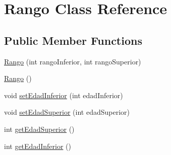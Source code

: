 \hypertarget{class_rango}{\section{Rango Class Reference}
\label{class_rango}
}
\subsection*{Public Member Functions}
\begin{DoxyCompactItemize}
\item 
\hyperlink{class_rango_aad365c7223fed54170da3b100af6fd81}{Rango} (int rango\+Inferior, int rango\+Superior)
\item 
\hyperlink{class_rango_ada7b488c2b1f8a362737f2795e5aedce}{Rango} ()
\item 
void \hyperlink{class_rango_afdf3104f892c99b1a963c5ba873be9c8}{set\+Edad\+Inferior} (int edad\+Inferior)
\item 
void \hyperlink{class_rango_ad6b19365f579231fc03541b62418de52}{set\+Edad\+Superior} (int edad\+Superior)
\item 
int \hyperlink{class_rango_af330df842f81084176cbaf5a15c947b9}{get\+Edad\+Superior} ()
\item 
int \hyperlink{class_rango_abcf7621bea5a9494eb4612b9fe08b519}{get\+Edad\+Inferior} ()
\end{DoxyCompactItemize}


